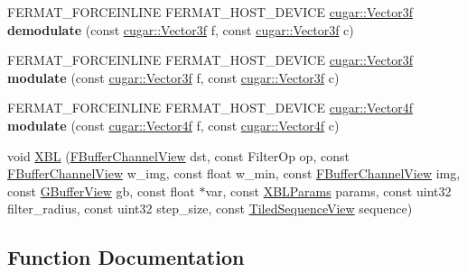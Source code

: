 \begin{DoxyCompactItemize}
\item 
\mbox{\label{group___filtering_module_ga66cbb0d32eb5ee64e6e88016171d527e}} 
F\+E\+R\+M\+A\+T\+\_\+\+F\+O\+R\+C\+E\+I\+N\+L\+I\+NE F\+E\+R\+M\+A\+T\+\_\+\+H\+O\+S\+T\+\_\+\+D\+E\+V\+I\+CE \hyperlink{structcugar_1_1_vector}{cugar\+::\+Vector3f} {\bfseries demodulate} (const \hyperlink{structcugar_1_1_vector}{cugar\+::\+Vector3f} f, const \hyperlink{structcugar_1_1_vector}{cugar\+::\+Vector3f} c)
\item 
\mbox{\label{group___filtering_module_ga37cc21fad8ca5eed0e45740ef71e2592}} 
F\+E\+R\+M\+A\+T\+\_\+\+F\+O\+R\+C\+E\+I\+N\+L\+I\+NE F\+E\+R\+M\+A\+T\+\_\+\+H\+O\+S\+T\+\_\+\+D\+E\+V\+I\+CE \hyperlink{structcugar_1_1_vector}{cugar\+::\+Vector3f} {\bfseries modulate} (const \hyperlink{structcugar_1_1_vector}{cugar\+::\+Vector3f} f, const \hyperlink{structcugar_1_1_vector}{cugar\+::\+Vector3f} c)
\item 
\mbox{\label{group___filtering_module_ga73a1db0dfe883e3b04738bd2b4d475c1}} 
F\+E\+R\+M\+A\+T\+\_\+\+F\+O\+R\+C\+E\+I\+N\+L\+I\+NE F\+E\+R\+M\+A\+T\+\_\+\+H\+O\+S\+T\+\_\+\+D\+E\+V\+I\+CE \hyperlink{structcugar_1_1_vector}{cugar\+::\+Vector4f} {\bfseries modulate} (const \hyperlink{structcugar_1_1_vector}{cugar\+::\+Vector4f} f, const \hyperlink{structcugar_1_1_vector}{cugar\+::\+Vector4f} c)
\item 
void \hyperlink{group___filtering_module_gaa39afad6e4488ce8af5d5ef4f0a48f00}{X\+BL} (\hyperlink{struct_f_buffer_channel_view}{F\+Buffer\+Channel\+View} dst, const Filter\+Op op, const \hyperlink{struct_f_buffer_channel_view}{F\+Buffer\+Channel\+View} w\+\_\+img, const float w\+\_\+min, const \hyperlink{struct_f_buffer_channel_view}{F\+Buffer\+Channel\+View} img, const \hyperlink{struct_g_buffer_view}{G\+Buffer\+View} gb, const float $\ast$var, const \hyperlink{struct_x_b_l_params}{X\+B\+L\+Params} params, const uint32 filter\+\_\+radius, const uint32 step\+\_\+size, const \hyperlink{struct_tiled_sequence_view}{Tiled\+Sequence\+View} sequence)
\end{DoxyCompactItemize}


\subsection{Function Documentation}
\mbox{\label{group___filtering_module_ga0ca4d81aa0d6833b3a0ecfdf891e03a6}} 
